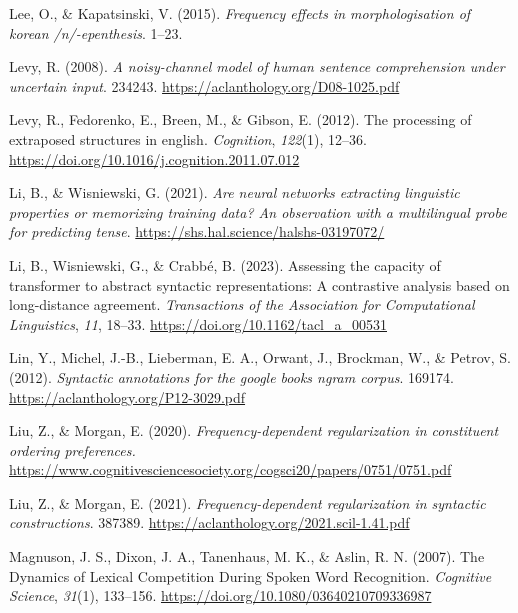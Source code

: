 \documentclass[
  12pt,
  letterpaper,
]{scrreport}
\newlength{\cslhangindent}
\newenvironment{CSLReferences}[2] %
 {\begin{list}{}{%
  \setlength{\itemindent}{0pt}
  \setlength{\leftmargin}{0pt}
  \setlength{\parsep}{0pt}
  \ifodd #1
   \setlength{\leftmargin}{\cslhangindent}
   \setlength{\itemindent}{-1\cslhangindent}
  \fi
  \setlength{\itemsep}{#2\baselineskip}}}
 {\end{list}}
\begin{document}
\begin{CSLReferences}{1}{0}
Lee, O., \& Kapatsinski, V. (2015). \emph{Frequency effects in
morphologisation of korean /n/-epenthesis}. 1--23.

Levy, R. (2008). \emph{A noisy-channel model of human sentence
comprehension under uncertain input}. 234243.
\url{https://aclanthology.org/D08-1025.pdf}

Levy, R., Fedorenko, E., Breen, M., \& Gibson, E. (2012). The processing
of extraposed structures in english. \emph{Cognition}, \emph{122}(1),
12--36. \url{https://doi.org/10.1016/j.cognition.2011.07.012}

Li, B., \& Wisniewski, G. (2021). \emph{Are neural networks extracting
linguistic properties or memorizing training data? An observation with a
multilingual probe for predicting tense}.
\url{https://shs.hal.science/halshs-03197072/}

Li, B., Wisniewski, G., \& Crabbé, B. (2023). Assessing the capacity of
transformer to abstract syntactic representations: A contrastive
analysis based on long-distance agreement. \emph{Transactions of the
Association for Computational Linguistics}, \emph{11}, 18--33.
\url{https://doi.org/10.1162/tacl_a_00531}

Lin, Y., Michel, J.-B., Lieberman, E. A., Orwant, J., Brockman, W., \&
Petrov, S. (2012). \emph{Syntactic annotations for the google books
ngram corpus}. 169174. \url{https://aclanthology.org/P12-3029.pdf}

Liu, Z., \& Morgan, E. (2020). \emph{Frequency-dependent regularization
in constituent ordering preferences.}
\url{https://www.cognitivesciencesociety.org/cogsci20/papers/0751/0751.pdf}

Liu, Z., \& Morgan, E. (2021). \emph{Frequency-dependent regularization
in syntactic constructions}. 387389.
\url{https://aclanthology.org/2021.scil-1.41.pdf}

Magnuson, J. S., Dixon, J. A., Tanenhaus, M. K., \& Aslin, R. N. (2007).
The Dynamics of Lexical Competition During Spoken Word Recognition.
\emph{Cognitive Science}, \emph{31}(1), 133--156.
\url{https://doi.org/10.1080/03640210709336987}


\end{CSLReferences}
\end{document}
